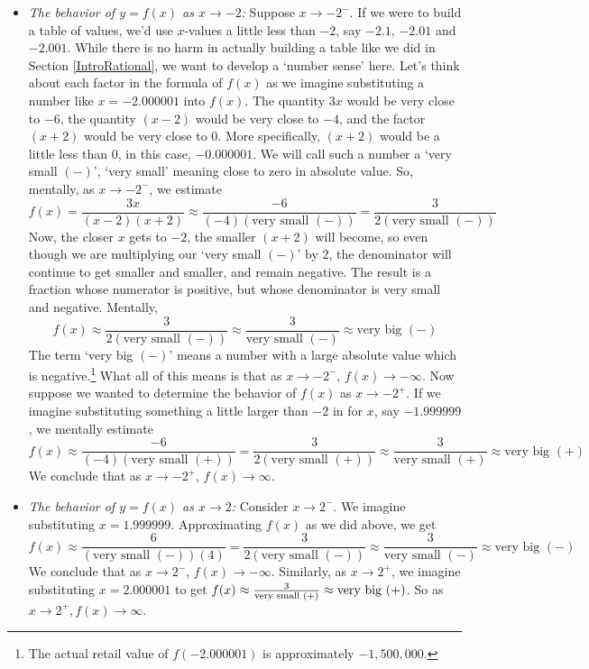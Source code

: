 \begin{ex}
\begin{enumerate}
\begin{itemize}
\item  \textit{The behavior of $y=f(x)$ as $x \rightarrow -2$:}  Suppose $x \rightarrow -2^{-}$.  If we were to build a table of values, we'd use $x$-values a little less than $-2$, say $-2.1$, $-2.01$ and $-2.001$.  While there is no harm in actually building a table like we did in Section \ref{IntroRational}, we want to develop a `number sense' here.  Let's think about each factor in the formula of $f(x)$ as we imagine substituting a number like $x=-2.000001$ into $f(x)$. The quantity $3x$ would be very close to $-6$, the quantity $(x-2)$ would be very close to $-4$, and the factor $(x+2)$ would be very close to $0$.  More specifically, $(x+2)$ would be a little less than $0$, in this case, $-0.000001.$  We will call such a number a `very small $(-)$', `very small' meaning close to zero in absolute value. So, mentally, as $x \rightarrow -2^{-}$, we estimate  \[ f(x)   = \dfrac{3x}{(x-2)(x+2)} \approx \dfrac{-6}{(-4)\left( \mbox{very small $(-)$}\right)} = \dfrac{3}{2 \left( \mbox{very small $(-)$}\right)} \]  Now, the closer $x$ gets to $-2$, the smaller $(x+2)$ will become, so even though we are multiplying our `very small $(-)$' by $2$, the denominator will continue to get smaller and smaller, and remain negative.  The result is a fraction whose numerator is positive, but whose denominator is very small and negative.  Mentally, \[f(x) \approx \dfrac{3}{2 \left( \mbox{very small $(-)$}\right)} \approx \dfrac{3}{\mbox{very small $(-)$}} \approx \mbox{very big $(-)$}\]  The term `very big $(-)$' means a number with a large absolute value which is negative.\footnote{The actual retail value of $f(-2.000001)$ is approximately $-1,\!500,\!000$.}  What all of this means is that as $x \rightarrow -2^{-}$, $f(x) \rightarrow -\infty$.  Now suppose we wanted to determine the behavior of $f(x)$ as $x \rightarrow -2^{+}$.  If we imagine substituting something a little larger than $-2$ in for $x$, say $-1.999999$, we mentally estimate \[ f(x) \approx \dfrac{-6}{(-4)\left( \mbox{very small $(+)$}\right)} = \dfrac{3}{2 \left( \mbox{very small $(+)$}\right)}  \approx \dfrac{3}{\mbox{very small $(+)$}} \approx \mbox{very big $(+)$}\]  We conclude that as $x \rightarrow -2^{+}$, $f(x) \rightarrow \infty$.

\item  \textit{The behavior of $y=f(x)$ as $x \rightarrow 2$:} Consider $x \rightarrow 2^{-}$. We imagine substituting $x = 1.999999$.  Approximating $f(x)$ as we did above, we get \[ f(x) \approx \dfrac{6}{\left( \mbox{very small $(-)$}\right)(4)} = \dfrac{3}{2 \left( \mbox{very small $(-)$}\right)}  \approx \dfrac{3}{\mbox{very small $(-)$}} \approx \mbox{very big $(-)$}\]  We conclude that as $x \rightarrow 2^{-}$, $f(x) \rightarrow -\infty$.  Similarly, as $x \rightarrow 2^{+}$, we imagine substituting $x = 2.000001$ to get $f(x) \approx \frac{3}{\mbox{\scriptsize very small $(+)$}} \approx \mbox{very big (+)}$.  So as $x \rightarrow 2^{+}, f(x) \rightarrow \infty$.
\end{itemize}


\end{enumerate}
\end{ex}
